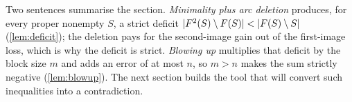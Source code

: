 \begin{checkpoint}
Two sentences summarise the section. \emph{Minimality plus arc deletion} produces, for every proper
nonempty $S$, a strict deficit $\lvert F^2(S)\setminus F(S)\rvert<\lvert F(S)\setminus S\rvert$
(\cref{lem:deficit}); the deletion pays for the second-image gain out of the first-image loss, which
is why the deficit is strict. \emph{Blowing up} multiplies that deficit by the block size $m$ and
adds an error of at most $n$, so $m>n$ makes the sum strictly negative
(\cref{lem:blowup}). The next section builds the tool that will convert such inequalities into a
contradiction.
\end{checkpoint}
